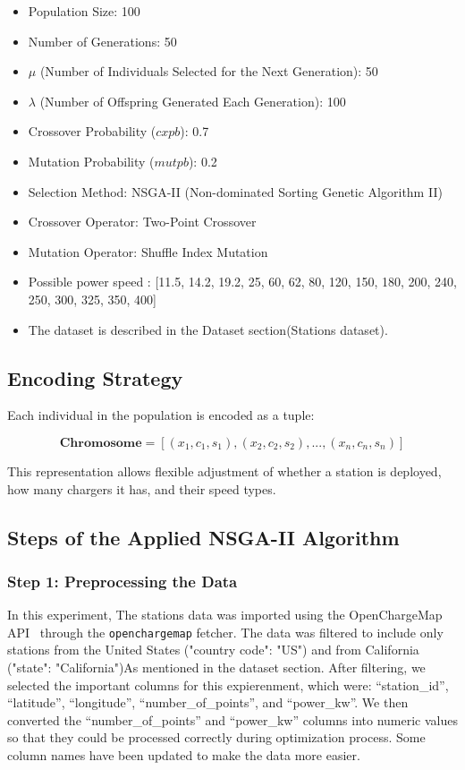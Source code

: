 \begin{itemize}
    \item Population Size: 100
    \item Number of Generations: 50
    \item $\mu$ (Number of Individuals Selected for the Next Generation): 50
    \item $\lambda$ (Number of Offspring Generated Each Generation): 100
    \item Crossover Probability ($cxpb$): 0.7
    \item Mutation Probability ($mutpb$): 0.2
    \item Selection Method: NSGA-II (Non-dominated Sorting Genetic Algorithm II)
    \item Crossover Operator: Two-Point Crossover
    \item Mutation Operator: Shuffle Index Mutation
    \item Possible power speed : [11.5, 14.2, 19.2, 25, 60, 62, 80, 120, 150, 180, 200, 240, 250, 300, 325, 350, 400]
    \item The dataset is described in the Dataset section(Stations dataset).

\end{itemize}

\subsection{Encoding Strategy}

Each individual in the population is encoded as a tuple:

\[
\textbf{Chromosome} = \left[ (x_1, c_1, s_1), (x_2, c_2, s_2), ..., (x_n, c_n, s_n) \right]
\]

This representation allows flexible adjustment of whether a station is deployed, how many chargers it has, and their speed types.

\subsection{Steps of the Applied NSGA-II Algorithm}
\subsubsection*{Step 1: Preprocessing the Data}

In this experiment, The stations data was imported using the OpenChargeMap API~\cite{openchargemap} through the \texttt{openchargemap} fetcher. The data was filtered to include only stations from the United States ("country code": "US") and from California ("state": "California")As mentioned in the dataset section. After filtering, we selected the important columns for this expierenment, which were: ``station\_id'', ``latitude'', ``longitude'', ``number\_of\_points'', and ``power\_kw''. We then converted the ``number\_of\_points'' and ``power\_kw'' columns into numeric values so that they could be processed correctly during optimization process. Some column names have been updated to make the data more easier. 


